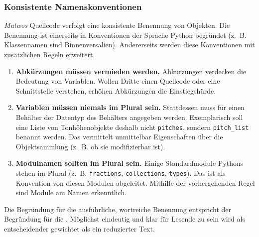 \documentclass[12pt,a4paper,ngerman]{article}
\begin{document}
\subsubsection{Konsistente Namenskonventionen}

\emph{Mutwos} Quellcode verfolgt eine konsistente Benennung von Objekten.
Die Benennung ist einerseits in Konventionen der Sprache Python begründet (z.~B. Klassennamen sind Binnenversalien).
Andererseits werden diese Konventionen mit zusätzlichen Regeln erweitert.

\begin{enumerate}
    \item{%
            \textbf{Abkürzungen müssen vermieden werden.}
            Abkürzungen verdecken die Bedeutung von Variablen.
            Wollen Dritte einen Quellcode oder eine Schnittstelle verstehen, erhöhen Abkürzungen die Einstiegshürde.
    }
    \item{%
            \textbf{Variablen müssen niemals im Plural sein.}
            Stattdessen muss für einen Behälter der Datentyp des Behälters angegeben werden.
            Exemplarisch soll eine Liste von Tonhöhenobjekte deshalb nicht \texttt{pitches}, sondern \texttt{pitch\_list} benannt werden.
            Das vermittelt unmittelbar Eigenschaften über die Objektsammlung (z.~B. ob sie modifizierbar ist).
    }
    \item{%
            \textbf{Modulnamen sollten im Plural sein.}
            Einige Standardmodule Pythons stehen im Plural (z.~B. \texttt{fractions}, \texttt{collections}, \texttt{types}).
            Das ist als Konvention von diesen Modulen abgeleitet.
            Mithilfe der vorhergehenden Regel sind Module am Namen erkenntlich.
    }
\end{enumerate}

Die Begründung für die ausführliche, wortreiche Benennung entspricht der Begründung für die \emph{}.
Möglichst eindeutig und klar für Lesende zu sein wird als entscheidender gewichtet als ein reduzierter Text.


% 
\end{document}
